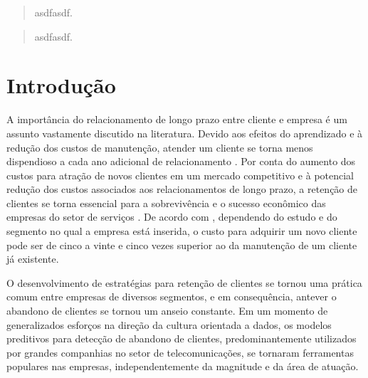 \documentclass[twocolumn]{rbef}
\author[]{Antonio C. da Silva Júnior}
\affil[]{Campus Santos, Universidade Paulista Av. Conselheiro Nébias 766, Boqueirão, 11045-002, Santos, SP, Brasil\thanks{\href{emailto:juniorssz@gmail.com}{\href{mailto:juniorssz@gmail.com}{\nolinkurl{juniorssz@gmail.com}}}}
}
\newcommand{\1}{\mathbbm{1}}
\begin{document}

\begin{primeirapagina}


  \begin{abstract}
    asdfasdf.

  \end{abstract}

  \begin{otherlanguage}{english}

    \begin{abstract}
      asdfasdf.

    \end{abstract}
  \end{otherlanguage}

\end{primeirapagina}
\saythanks

\hypertarget{introduuxe7uxe3o}{%
\section{Introdução}\label{introduuxe7uxe3o}}

A importância do relacionamento de longo prazo entre cliente e empresa é um assunto vastamente discutido na literatura. Devido aos efeitos do aprendizado e à redução dos custos de manutenção, atender um cliente se torna menos dispendioso a cada ano adicional de relacionamento \cite{Ganesh2000}. Por conta do aumento dos custos para atração de novos clientes em um mercado competitivo e à potencial redução dos custos associados aos relacionamentos de longo prazo, a retenção de clientes se torna essencial para a sobrevivência e o sucesso econômico das empresas do setor de serviços \cite{HennigThurau2004}. De acordo com \cite{Gallo2014}, dependendo do estudo e do segmento no qual a empresa está inserida, o custo para adquirir um novo cliente pode ser de cinco a vinte e cinco vezes superior ao da manutenção de um cliente já existente.

O desenvolvimento de estratégias para retenção de clientes se tornou uma prática comum entre empresas de diversos segmentos, e em consequência, antever o abandono de clientes se tornou um anseio constante. Em um momento de generalizados esforços na direção da cultura orientada a dados, os modelos preditivos para detecção de abandono de clientes, predominantemente utilizados por grandes companhias no setor de telecomunicações, se tornaram ferramentas populares nas empresas, independentemente da magnitude e da área de atuação.
\end{document}
